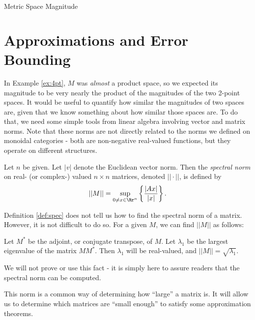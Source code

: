 \documentclass[12pt]{pom_thesis}
\begin{document}
\begin{chapter}{Metric Space Magnitude}
\section{Approximations and Error Bounding}
In Example \ref{ex:4pt}, $M$ was \emph{almost} a product space, so we expected its magnitude to be very nearly the product of the magnitudes of the two 2-point spaces. It would be useful to quantify how similar the magnitudes of two spaces are, given that we know something about how similar those spaces are. To do that, we need some simple tools from linear algebra involving vector and matrix norms. Note that these norms are not directly related to the norms we defined on monoidal categories - both are non-negative real-valued functions, but they operate on different structures.

\begin{defn}\label{def:spec}
Let $n$ be given. Let $|v|$ denote the Euclidean vector norm. Then the \emph{spectral norm} on real- (or complex-) valued $n \times n$ matrices, denoted $||\cdot ||$, is defined by
\[
||M|| = \sup_{0 \neq x \in \Rr^n}\left\{ \frac{|Ax|}{|x|} \right\}.
\]
\end{defn}
\begin{rmk}
Definition \ref{def:spec} does not tell us how to find the spectral norm of a matrix. However, it is not difficult to do so. For a given $M$, we can find $||M||$ as follows:

Let $M^*$ be the adjoint, or conjugate transpose, of $M$. Let $\lambda_1$ be the largest eigenvalue of the matrix $MM^*$. Then $\lambda_1$ will be real-valued, and $||M||=\sqrt{\lambda_1}$. 

We will not prove or use this fact - it is simply here to assure readers that the spectral norm can be computed.
\end{rmk}
This norm is a common way of determining how ``large'' a matrix is. It will allow us to determine which matrices are ``small enough'' to satisfy some approximation theorems.


\end{chapter}
\end{document}
